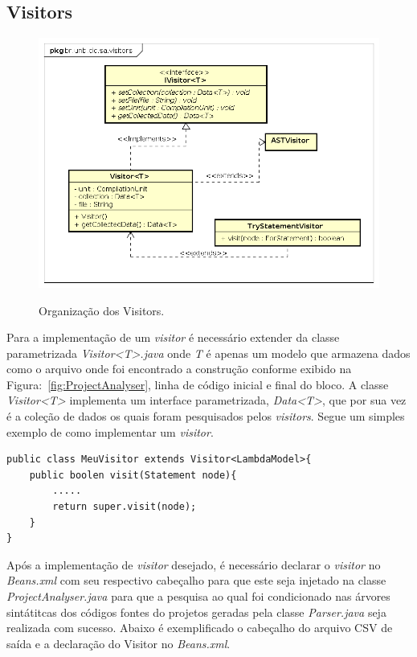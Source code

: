 \subsection{Visitors}
\begin{figure}[h]
\center
\includegraphics[scale=0.5]{Imagens/Visitors}
\label{fig:arqVisitor}
\caption{Organização dos Visitors.}
\end{figure}

Para a implementação de um \textit{visitor} é necessário extender da classe parametrizada \textit{Visitor<T>.java} onde \textit{T} é apenas um modelo que armazena dados como o arquivo onde foi encontrado a construção conforme exibido na Figura:~\ref{fig:ProjectAnalyser}, linha de código inicial e final do bloco. A classe \textit{Visitor<T>} implementa um interface parametrizada, \textit{Data<T>}, que por sua vez é a coleção de dados os quais foram pesquisados pelos \textit{visitors}. Segue um simples exemplo de como implementar um \textit{visitor}. 

\begin{lstlisting}
public class MeuVisitor extends Visitor<LambdaModel>{
	public boolen visit(Statement node){
		.....
		return super.visit(node);
	}
}
\end{lstlisting}

Após a implementação de \textit{visitor} desejado, é necessário declarar o \textit{visitor} no \textit{Beans.xml} com seu respectivo cabeçalho para que este seja injetado na classe \textit{ProjectAnalyser.java} para que a pesquisa ao qual foi condicionado nas árvores sintátitcas dos códigos fontes do projetos geradas pela classe \textit{Parser.java} seja realizada com sucesso. Abaixo é exemplificado o cabeçalho do arquivo \acs{CSV} de saída e a declaração do Visitor no \textit{Beans.xml}.

